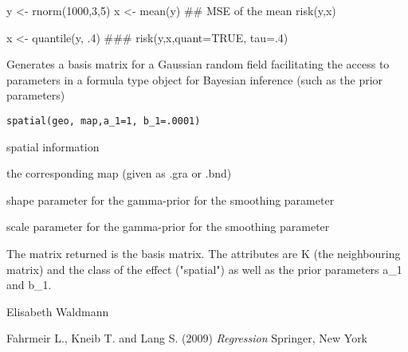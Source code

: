 \documentclass[a4paper]{book}
\begin{document}
%
\begin{Examples}
\begin{ExampleCode}
y <- rnorm(1000,3,5)
x <- mean(y)
## MSE of the mean
risk(y,x)

x <- quantile(y, .4)
###
risk(y,x,quant=TRUE, tau=.4)

\end{ExampleCode}
\end{Examples}
%
\begin{Description}\relax

Generates a basis matrix for a Gaussian random field facilitating the access to parameters in a formula type object
for Bayesian inference (such as the prior parameters)
\end{Description}
%
\begin{Usage}
\begin{verbatim}
spatial(geo, map,a_1=1, b_1=.0001)
\end{verbatim}
\end{Usage}
%
\begin{Arguments}
\begin{ldescription}
\item[\code{geo}] 
spatial information
\item[\code{map}] 
the corresponding map (given as .gra or .bnd) 
\item[\code{a\_1}] 
shape parameter for the gamma-prior for the smoothing parameter
\item[\code{b\_1}] 
scale parameter for the gamma-prior for the smoothing parameter

\end{ldescription}
\end{Arguments}
%
\begin{Value}


The matrix returned is the basis matrix. The attributes are
K (the neighbouring matrix) and the class of the effect ("spatial") as well as the prior parameters a\_1 and b\_1.

\end{Value}
%
\begin{Author}\relax
Elisabeth Waldmann


\end{Author}
%
\begin{References}\relax

Fahrmeir L., Kneib T. and Lang S. (2009) \emph{Regression} Springer, New York
\end{References}
\end{document}
